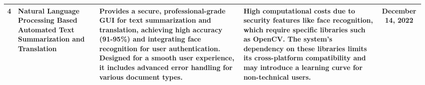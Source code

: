 \documentclass{article}
\begin{document}
\begin{table}[htp]
\begin{tabular}{|c|p{4cm}|p{4cm}|p{4cm}|c|}
4 & Natural Language Processing Based Automated Text Summarization and Translation & Provides a secure, professional-grade GUI for text summarization and translation, achieving high accuracy (91-95\%) and integrating face recognition for user authentication. Designed for a smooth user experience, it includes advanced error handling for various document types. & High computational costs due to security features like face recognition, which require specific libraries such as OpenCV. The system’s dependency on these libraries limits its cross-platform compatibility and may introduce a learning curve for non-technical users. & December 14, 2022 \\ \hline

\end{tabular}
\end{table}

\newpage
\clearpage
\end{document}
